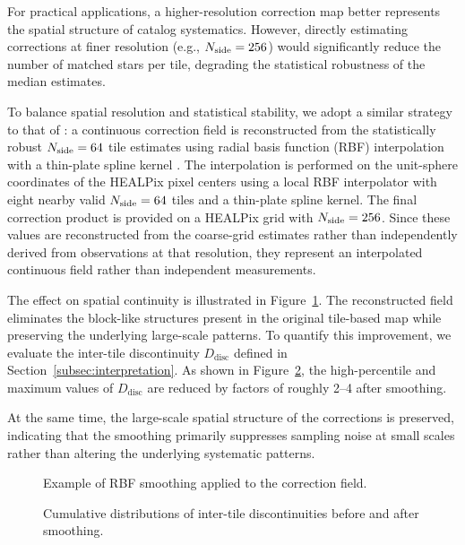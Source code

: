 \documentclass[linenumbers,amsmath,manuscript]{aastex702}
\begin{document}
For practical applications, a higher-resolution correction map better represents the spatial structure of catalog systematics. However, directly estimating corrections at finer resolution (e.g., $N_{\rm side}=256$) would significantly reduce the number of matched stars per tile, degrading the statistical robustness of the median estimates.

To balance spatial resolution and statistical stability, we adopt a similar strategy to that of \citet{Eggl2020}: a continuous correction field is reconstructed from the statistically robust $N_{\rm side}=64$ tile estimates using radial basis function (RBF) interpolation with a thin-plate spline kernel \citep{Wahba1990,Schaback1995}. The interpolation is performed on the unit-sphere coordinates of the HEALPix pixel centers using a local RBF interpolator with eight nearby valid $N_{\rm side}=64$ tiles and a thin-plate spline kernel. The final correction product is provided on a HEALPix grid with $N_{\rm side}=256$. Since these values are reconstructed from the coarse-grid estimates rather than independently derived from observations at that resolution, they represent an interpolated continuous field rather than independent measurements.

The effect on spatial continuity is illustrated in Figure~\ref{fig:bias_ucac4_zoom_compare_n256}. The reconstructed field eliminates the block-like structures present in the original tile-based map while preserving the underlying large-scale patterns. To quantify this improvement, we evaluate the inter-tile discontinuity $D_{\mathrm{disc}}$ defined in Section~\ref{subsec:interpretation}. As shown in Figure~\ref{fig:bias_jump}, the high-percentile and maximum values of $D_{\mathrm{disc}}$ are reduced by factors of roughly 2--4 after smoothing.

At the same time, the large-scale spatial structure of the corrections is preserved, indicating that the smoothing primarily suppresses sampling noise at small scales rather than altering the underlying systematic patterns.

\begin{figure}[ht!]
\caption{Example of RBF smoothing applied to the correction field.}
\label{fig:bias_ucac4_zoom_compare_n256}
\end{figure}

\begin{figure}[ht!]
\caption{Cumulative distributions of inter-tile discontinuities before and after smoothing.}
\label{fig:bias_jump}
\end{figure}
\end{document}
